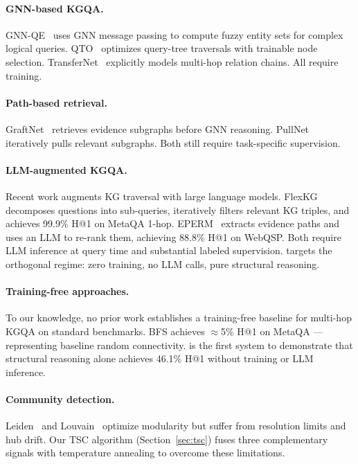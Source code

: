 \documentclass[10pt,twocolumn]{article}
\begin{document}
\paragraph{GNN-based KGQA.}
GNN-QE~\cite{zhu2022gnnqe} uses GNN message passing to compute fuzzy entity sets for
complex logical queries. QTO~\cite{bai2023qto} optimizes query-tree traversals with
trainable node selection. TransferNet~\cite{shi2021transfernet} explicitly models
multi-hop relation chains. All require training.

\paragraph{Path-based retrieval.}
GraftNet~\cite{sun2018graftnet} retrieves evidence subgraphs before GNN reasoning.
PullNet~\cite{sun2019pullnet} iteratively pulls relevant subgraphs. Both still require
task-specific supervision.

\paragraph{LLM-augmented KGQA.}
Recent work augments KG traversal with large language models.
FlexKG~\cite{flexkg2025} decomposes questions into sub-queries, iteratively filters
relevant KG triples, and achieves 99.9\% H@1 on MetaQA 1-hop.
EPERM~\cite{eperm2025} extracts evidence paths and uses an LLM to re-rank them,
achieving 88.8\% H@1 on WebQSP. Both require LLM inference at query time and
substantial labeled supervision. \CEREBRUM{} targets the orthogonal regime: zero
training, no LLM calls, pure structural reasoning.

\paragraph{Training-free approaches.}
To our knowledge, no prior work establishes a training-free baseline for multi-hop KGQA
on standard benchmarks. BFS achieves $\approx$5\% H@1 on MetaQA — representing
baseline random connectivity. \CEREBRUM{} is the first system to demonstrate that
structural reasoning alone achieves 46.1\% H@1 without training or LLM inference.

\paragraph{Community detection.}
Leiden~\cite{traag2019louvain} and Louvain~\cite{blondel2008louvain} optimize modularity but
suffer from resolution limits and hub drift. Our TSC algorithm (Section~\ref{sec:tsc})
fuses three complementary signals with temperature annealing to overcome these
limitations.
\end{document}
